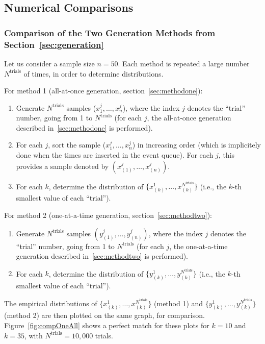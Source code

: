 \documentclass[12pt]{article} %
\begin{document}
\subsection{Numerical Comparisons}
%
%
\subsubsection{Comparison of the Two Generation Methods from Section~\ref{sec:generation}}
Let us consider a sample size $n=50$. Each method is repeated a large number $N^\text{trials}$ of times, in order to determine distributions.\par
For method 1 (all-at-once generation, section~\ref{sec:methodone}):
\begin{enumerate}
\item Generate $N^\text{trials}$ samples ($x^j_1,\ldots,x^j_n$), where the index $j$ denotes the ``trial'' number, going from 1 to $N^\text{trials}$ (for each $j$, the all-at-once generation described in~\ref{sec:methodone} is performed).
\item For each $j$, sort the sample ($x^j_1,\ldots,x^j_n$) in increasing order (which is implicitely done when the times are inserted in the event queue). For each $j$, this provides a sample denoted by $(x^j_{(1)},\ldots,x^j_{(n)})$.
\item For each $k$, determine the distribution of $\{x^1_{(k)},\ldots,x^{N^\text{trials}}_{(k)}\}$ (i.e., the $k$-th smallest value of each ``trial'').
\end{enumerate}
For method 2 (one-at-a-time generation, section~\ref{sec:methodtwo}):
\begin{enumerate}
\item Generate $N^\text{trials}$ samples $(y^j_{(1)},\ldots,y^j_{(n)})$, where the index $j$ denotes the ``trial'' number, going from 1 to $N^\text{trials}$ (for each $j$, the one-at-a-time generation described in~\ref{sec:methodtwo} is performed).
\item For each $k$, determine the distribution of $\{y^1_{(k)},\ldots,y^{N^\text{trials}}_{(k)}\}$ (i.e., the $k$-th smallest value of each ``trial'').
\end{enumerate}
The empirical distributions of $\{x^1_{(k)},\ldots,x^{N^\text{trials}}_{(k)}\}$ (method 1) and $\{y^1_{(k)},\ldots,y^{N^\text{trials}}_{(k)}\}$ (method 2) are then plotted on the same graph, for comparison. Figure~\ref{fig:compOneAll} shows a perfect match for these plots for $k=10$ and $k=35$, with $N^\text{trials}=10,000$ trials.
\end{document}
